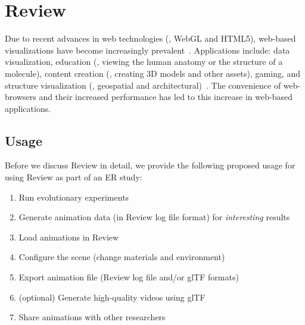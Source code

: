 \section{Review}
\label{sec:review}

Due to recent advances in web technologies (\eg{}, WebGL and HTML5), web-based visualizations have become increasingly prevalent~\autocite{Evans.2014.CGJourn.Survey}.
%
Applications include: data visualization, education (\eg{}, viewing the human anatomy or the structure of a molecule), content creation (\ie{}, creating 3D models and other assets), gaming, and structure visualization (\eg{}, geospatial and architectural)~\autocite{Moore.2014.ALIFE.Web,Evans.2014.CGJourn.Survey,Mwalongo.2016.CompGraphForum.Web}.
%
The convenience of web-browsers and their increased performance has led to this increase in web-based applications.


\subsection{Usage}

Before we discuss Review in detail, we provide the following proposed usage for using Review as part of an ER study:

\begin{enumerate}
  \item Run evolutionary experiments
  \item Generate animation data (in Review log file format) for \emph{interesting} results
  \item Load animations in Review
  \item Configure the scene (change materials and environment)
  \item Export animation file (Review log file and/or glTF formats)
  \item (optional) Generate high-quality videos using glTF
  \item Share animations with other researchers
\end{enumerate}

